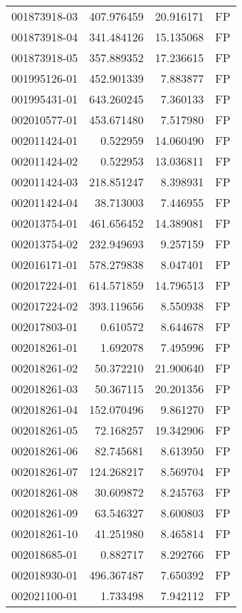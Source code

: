 \begin{tabular}{lrrl}
001873918-03 &  407.976459 &    20.916171 &   FP \\
001873918-04 &  341.484126 &    15.135068 &   FP \\
001873918-05 &  357.889352 &    17.236615 &   FP \\
001995126-01 &  452.901339 &     7.883877 &   FP \\
001995431-01 &  643.260245 &     7.360133 &   FP \\
002010577-01 &  453.671480 &     7.517980 &   FP \\
002011424-01 &    0.522959 &    14.060490 &   FP \\
002011424-02 &    0.522953 &    13.036811 &   FP \\
002011424-03 &  218.851247 &     8.398931 &   FP \\
002011424-04 &   38.713003 &     7.446955 &   FP \\
002013754-01 &  461.656452 &    14.389081 &   FP \\
002013754-02 &  232.949693 &     9.257159 &   FP \\
002016171-01 &  578.279838 &     8.047401 &   FP \\
002017224-01 &  614.571859 &    14.796513 &   FP \\
002017224-02 &  393.119656 &     8.550938 &   FP \\
002017803-01 &    0.610572 &     8.644678 &   FP \\
002018261-01 &    1.692078 &     7.495996 &   FP \\
002018261-02 &   50.372210 &    21.900640 &   FP \\
002018261-03 &   50.367115 &    20.201356 &   FP \\
002018261-04 &  152.070496 &     9.861270 &   FP \\
002018261-05 &   72.168257 &    19.342906 &   FP \\
002018261-06 &   82.745681 &     8.613950 &   FP \\
002018261-07 &  124.268217 &     8.569704 &   FP \\
002018261-08 &   30.609872 &     8.245763 &   FP \\
002018261-09 &   63.546327 &     8.600803 &   FP \\
002018261-10 &   41.251980 &     8.465814 &   FP \\
002018685-01 &    0.882717 &     8.292766 &   FP \\
002018930-01 &  496.367487 &     7.650392 &   FP \\
002021100-01 &    1.733498 &     7.942112 &   FP \\

\end{tabular}
